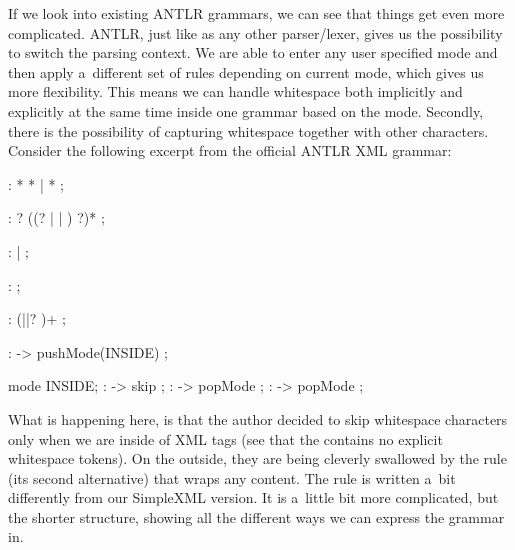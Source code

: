 If we look into existing ANTLR grammars, we can see that things get even more complicated.
ANTLR, just like as any other parser/lexer, gives us the possibility to switch the parsing context.
We are able to enter any user specified mode and then apply a~different set of rules depending on current mode, which gives us more flexibility.
This means we can handle whitespace both implicitly and explicitly at the same time inside one grammar based on the mode.
Secondly, there is the possibility of capturing whitespace together with other characters.
Consider the following excerpt from the official ANTLR XML grammar:

\begin{antlr}
	     :   \literal{<}  * \literal{>} * \literal{</}  \literal{>}
	            |   \literal{<}  * \literal{/>}
	            ;

	     :   ?
                ((? |  | ) ?)* ;

	    :    |  ;

	        :   \regex{~[<&]+} ;

	      :   (\literal{ }||? )+ ;

	        :   \literal{<}             -> pushMode(INSIDE) ;

	mode INSIDE;
	           :          -> skip ;
	       :   \literal{<}             -> popMode ;
	 :   \literal{/>}            -> popMode ;
\end{antlr}

What is happening here, is that the author decided to skip whitespace characters only when we are inside of XML tags (see that the  contains no explicit whitespace tokens).
On the outside, they are being cleverly swallowed by the  rule (its second alternative) that wraps any content.
The  rule is written a~bit differently from our SimpleXML version.
It is a~little bit more complicated, but the shorter structure, showing all the different ways we can express the grammar in.
\\

